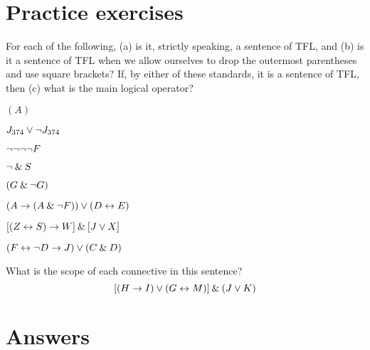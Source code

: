 

\section{Practice exercises}
\setcounter{ProbPart}{0}

\problempart
\label{pr.wiffTFL}
For each of the following, (a) is it, strictly speaking, a sentence of TFL, and (b) is it a sentence of TFL when we allow ourselves to drop the outermost parentheses and use square brackets? If, by either of these standards, it is a sentence of TFL, then (c) what is the main logical operator?
\begin{earg}
\item $(A)$
\item $J_{374} \vee {\neg} J_{374}$
\item ${\neg} {\neg} {\neg} {\neg} F$
\item ${\neg} \mathbin{\&} S$
\item $(G \mathbin{\&} {\neg} G)$
\item $(A \rightarrow (A \mathbin{\&} {\neg} F)) \vee (D \leftrightarrow E)$
\item $[(Z \leftrightarrow S) \rightarrow W] \mathbin{\&} [J \vee X]$
\item $(F \leftrightarrow {\neg} D \rightarrow J) \vee (C \mathbin{\&} D)$
\end{earg}


\problempart
What is the scope of each connective in this sentence?
$$[(H \rightarrow I) \vee (G \leftrightarrow M)] \mathbin{\&} (J \vee K)$$



\section{Answers}
\setcounter{ProbPart}{0}


